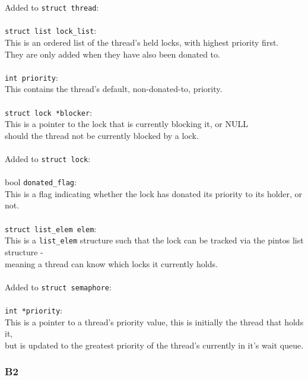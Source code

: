 \documentclass[a4wide, 11pt]{article}
\newcommand{\tab}{\hspace*{2em}}
\newcommand{\tx}{\texttt}
\begin{document}
Added to \tx{struct thread}: \\\\
\tab\tab \tx{struct list lock\_list}:\\
\tab\tab This is an ordered list of the thread's held locks, with highest priority first. \\
\tab\tab They are only added when they have also been donated to.
\\\\
 \tab\tab   \tx{int priority}:\\
 \tab\tab This contains the thread's default, non-donated-to, priority.
\\\\
\tab\tab \tx{struct lock *blocker}:\\
\tab\tab This is a pointer to the lock that is currently blocking it, or NULL \\
\tab\tab should the thread not be currently blocked by a lock.
    \\\\    
Added to \tx{struct lock}:
\\\\
\tab\tab bool \tx{donated\_flag}:\\
\tab\tab This is a flag indicating whether the lock has donated its priority to its holder, or not.
\\\\
\tab\tab \tx{struct list\_elem elem}:\\
\tab\tab This is a \tx{list\_elem} structure such that the lock can be tracked via the pintos list structure -\\
\tab\tab meaning a thread can know which locks it currently holds.
\\\\
Added to \tx{struct semaphore}:
  \\\\  
\tab\tab \tx{int *priority}:\\
\tab\tab This is a pointer to a thread's priority value, this is initially the thread that holds it,\\
\tab\tab but is updated to the greatest priority of the thread's currently in it's wait queue.
\newpage

\subsubsection{B2}
\end{document}
